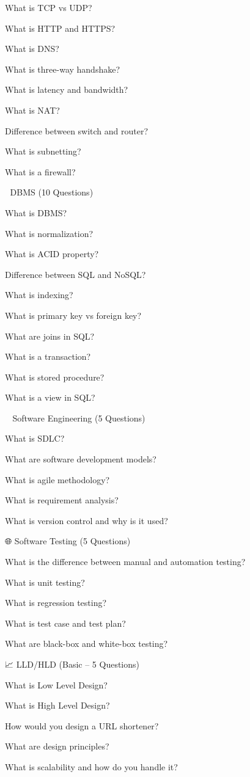 What is TCP vs UDP?

What is HTTP and HTTPS?

What is DNS?

What is three-way handshake?

What is latency and bandwidth?

What is NAT?

Difference between switch and router?

What is subnetting?

What is a firewall?

🔹 DBMS (10 Questions)

What is DBMS?

What is normalization?

What is ACID property?

Difference between SQL and NoSQL?

What is indexing?

What is primary key vs foreign key?

What are joins in SQL?

What is a transaction?

What is stored procedure?

What is a view in SQL?

👨‍💻 Software Engineering (5 Questions)

What is SDLC?

What are software development models?

What is agile methodology?

What is requirement analysis?

What is version control and why is it used?

🌐 Software Testing (5 Questions)

What is the difference between manual and automation testing?

What is unit testing?

What is regression testing?

What is test case and test plan?

What are black-box and white-box testing?

📈 LLD/HLD (Basic – 5 Questions)

What is Low Level Design?

What is High Level Design?

How would you design a URL shortener?

What are design principles?

What is scalability and how do you handle it?

